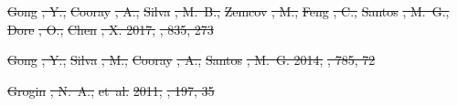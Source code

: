 \documentclass[numberedappendix]{emulateapj}
\providecommand{\DIFdel}[1]{{\protect\color{red}\sout{#1}}}                      %
\begin{document}
\DIFdel{Gong}%
\DIFdel{, Y., }%
\DIFdel{Cooray}%
\DIFdel{, A., }%
\DIFdel{Silva}%
\DIFdel{, M.~B., }%
\DIFdel{Zemcov}%
\DIFdel{, M., }%
\DIFdel{Feng}%
\DIFdel{, C., }%
\DIFdel{Santos}%
\DIFdel{,
  M.~G., }%
\DIFdel{Dore}%
\DIFdel{, O., }%
\DIFdel{Chen}%
\DIFdel{, X. 2017, }%
\DIFdel{, 835, 273
}%

\DIFdel{Gong}%
\DIFdel{, Y., }%
\DIFdel{Silva}%
\DIFdel{, M., }%
\DIFdel{Cooray}%
\DIFdel{, A., }%
\DIFdel{Santos}%
\DIFdel{, M.~G. 2014, }%
\DIFdel{, 785, 72
}%

\DIFdel{Grogin}%
\DIFdel{, N.~A., }%
\DIFdel{et~al.}%
\DIFdel{2011, }%
\DIFdel{, 197, 35
}%
\end{document}
